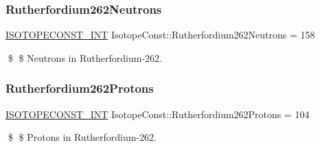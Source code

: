 \subsubsection{\texorpdfstring{Rutherfordium262\+Neutrons}{Rutherfordium262Neutrons}}
{\footnotesize\ttfamily \mbox{\hyperlink{group___isotope_const-_macros_ga5f18360b3e99483a35c32d789e62621c}{I\+S\+O\+T\+O\+P\+E\+C\+O\+N\+S\+T\+\_\+\+I\+NT}} Isotope\+Const\+::\+Rutherfordium262\+Neutrons = 158}

\$ \$ Neutrons in Rutherfordium-\/262. \mbox{\label{group___isotope_const-_rutherfordium-_rf262_ga10c9d89e4ed7ba4a2dd833dce5145159}} 
\subsubsection{\texorpdfstring{Rutherfordium262\+Protons}{Rutherfordium262Protons}}
{\footnotesize\ttfamily \mbox{\hyperlink{group___isotope_const-_macros_ga5f18360b3e99483a35c32d789e62621c}{I\+S\+O\+T\+O\+P\+E\+C\+O\+N\+S\+T\+\_\+\+I\+NT}} Isotope\+Const\+::\+Rutherfordium262\+Protons = 104}

\$ \$ Protons in Rutherfordium-\/262. 